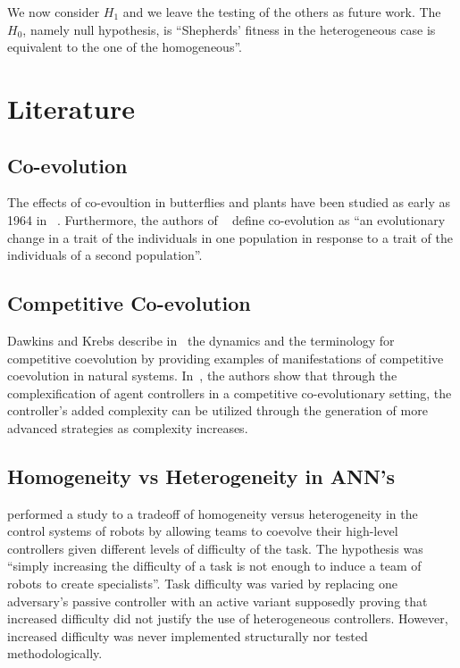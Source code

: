 \documentclass[conference]{IEEEtran}
\begin{document}
We now consider $H_1$ and we leave the testing of the others as future work. 
The $H_0$, namely null hypothesis, is ``Shepherds’ fitness in the heterogeneous case is equivalent to the one of the homogeneous''.

\section{Literature}
 
\subsection{Co-evolution}
The effects of co-evoultion in butterflies and plants have been studied as early as 1964 in ~\cite{ehrlich1964butterflies}.
Furthermore, the authors of ~\cite{janzen1980coevolution} define co-evolution as ``an evolutionary change in a trait of the individuals in one population in response to a trait of the individuals of a second population''.


\subsection{Competitive Co-evolution}
Dawkins and Krebs describe in~\cite{dawkins1979arms} the dynamics and the terminology for competitive coevolution by providing examples of manifestations of competitive coevolution in natural systems.
In~\cite{stanley2004competitive}, the authors show that through the complexification of agent controllers in a competitive co-evolutionary setting, the controller's added complexity can be utilized through the generation of more advanced strategies as complexity increases.


\subsection{Homogeneity vs Heterogeneity in ANN's}
\cite{potter2001heterogeneity} performed a study to a tradeoff of homogeneity versus heterogeneity in the control systems of robots by allowing teams to coevolve their high-level controllers given different levels of difficulty of the task.
The hypothesis was ``simply increasing the difficulty of a task is not enough to induce a team of robots to create specialists''.
Task difficulty was varied by replacing one adversary's passive controller with an active variant supposedly proving that increased difficulty did not justify the use of heterogeneous controllers.
However, increased difficulty was never implemented structurally nor tested methodologically. 
\end{document}
